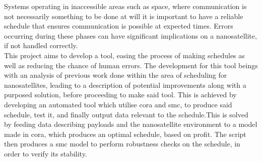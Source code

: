 Systems operating in inaccessible areas such as space, where communication is not necessarily something to be done at will it is important to have a reliable schedule that ensures communication is possible at expected times. Errors occurring during these phases can have significant implications on a nanosatellite, if not handled correctly.\\
This project aims to develop a tool, easing the process of making schedules as well as reducing the chance of human errors. The development for this tool beings with an analysis of previous work done within the area of scheduling for nanosatellites, leading to a description of potential improvements along with a purposed solution, before proceeding to make said tool. This is achieved by developing an automated tool which utilise \acrshort{cora} and \acrshort{smc}, to produce said schedule, test it, and finally output data relevant to the schedule.This is solved by feeding data describing payloads and the nanosatellite environment to a model made in \acrshort{cora}, which produces an optimal schedule, based on profit. The script then produces a \acrshort{smc} model to perform robustness checks on the schedule, in order to verify its stability.

\glsresetall